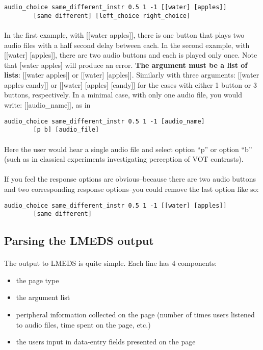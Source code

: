 \begin{lstlisting}
audio_choice same_different_instr 0.5 1 -1 [[water] [apples]]
		[same different] [left_choice right_choice]
\end{lstlisting}

\paragraph{}
In the first example, with [[water apples]], there is one button that plays two audio files with a half second delay between each.  In the second example, with [[water] [apples]], there are two audio buttons and each is played only once.  Note that [water apples] will produce an error.  \textbf{The argument must be a list of lists}: [[water apples]] or [[water] [apples]].  Similarly with three arguments: [[water apples candy]] or [[water] [apples] [candy]] for the cases with either 1 button or 3 buttons, respectively.  In a minimal case, with only one audio file, you would write: [[audio\_name]], as in 

\begin{lstlisting}
audio_choice same_different_instr 0.5 1 -1 [audio_name]
		[p b] [audio_file]
\end{lstlisting}

\paragraph{}
Here the user would hear a single audio file and select option ``p'' or option ``b'' (such as in classical experiments investigating perception of VOT contrasts).

\paragraph{}
If you feel the response options are obvious--because there are two audio buttons and two corresponding response options--you could remove the last option like so:
\begin{lstlisting}
audio_choice same_different_instr 0.5 1 -1 [[water] [apples]]
		[same different]
\end{lstlisting}


\subsection{Parsing the LMEDS output}

\paragraph{}
The output to LMEDS is quite simple.  Each line has 4 components:
\begin{itemize}
\item	the page type
\item	the argument list
\item	peripheral information collected on the page (number of times users listened to audio files, time spent on the page, etc.)
\item	the users input in data-entry fields presented on the page
\end{itemize}

